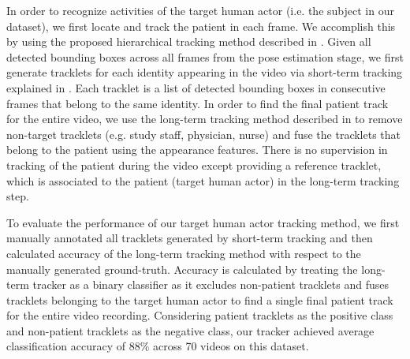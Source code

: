 In order to recognize activities of the target human actor (i.e. the subject in our dataset), we first locate and track the patient in each frame. We accomplish this by using the proposed hierarchical tracking method described in . Given all detected bounding boxes across all frames from the pose estimation stage, we first generate tracklets for each identity appearing in the video via short-term tracking explained in . Each tracklet is a list of detected bounding boxes in consecutive frames that belong to the same identity. In order to find the final patient track for the entire video, we use the long-term tracking method described in  to remove non-target tracklets (e.g. study staff, physician, nurse) and fuse the tracklets that belong to the patient using the appearance features. There is no supervision in tracking of the patient during the video except providing a reference tracklet, which is associated to the patient (target human actor) in the long-term tracking step.

To evaluate the performance of our target human actor tracking method, we first manually annotated all tracklets generated by short-term tracking and then calculated accuracy of the long-term tracking method with respect to the manually generated ground-truth. Accuracy is calculated by treating the long-term tracker as a binary classifier as it excludes non-patient tracklets and fuses tracklets belonging to the target human actor to find a single final patient track for the entire video recording. Considering patient tracklets as the positive class and non-patient tracklets as the negative class, our tracker achieved average classification accuracy of 88\% across 70 videos on this dataset.


